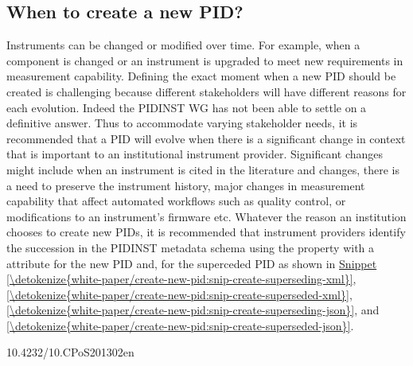 \documentclass[a4paper,10pt,english]{sphinxmanual}
\begin{document}
\subsection{When to create a new PID?}
\label{\detokenize{white-paper/create-new-pid:when-to-create-a-new-pid}}\label{\detokenize{white-paper/create-new-pid::doc}}
Instruments can be changed or modified over time. For example, when a
component is changed or an instrument is upgraded to meet new
requirements in measurement capability. Defining the exact moment when a
new PID should be created is challenging because different stakeholders
will have different reasons for each evolution. Indeed the PIDINST WG
has not been able to settle on a definitive answer. Thus to accommodate
varying stakeholder needs, it is recommended that a PID will evolve when
there is a significant change in context that is important to an
institutional instrument provider. Significant changes might include
when an instrument is cited in the literature and changes, there is a
need to preserve the instrument history, major changes in measurement
capability that affect automated workflows such as quality control, or
modifications to an instrument’s firmware etc. Whatever the reason an
institution chooses to create new PIDs, it is recommended that
instrument providers identify the succession in the PIDINST metadata
schema using the  property with a 
attribute  for the new PID and, 
for the superceded PID as shown in
\hyperref[\detokenize{white-paper/create-new-pid:snip-create-superseding-xml}]{Snippet \ref{\detokenize{white-paper/create-new-pid:snip-create-superseding-xml}}},
\hyperref[\detokenize{white-paper/create-new-pid:snip-create-superseded-xml}]{\ref{\detokenize{white-paper/create-new-pid:snip-create-superseded-xml}}},
\hyperref[\detokenize{white-paper/create-new-pid:snip-create-superseding-json}]{\ref{\detokenize{white-paper/create-new-pid:snip-create-superseding-json}}}, and
\hyperref[\detokenize{white-paper/create-new-pid:snip-create-superseded-json}]{\ref{\detokenize{white-paper/create-new-pid:snip-create-superseded-json}}}.
\def\sphinxLiteralBlockLabel{\label{\detokenize{white-paper/create-new-pid:id1}}\label{\detokenize{white-paper/create-new-pid:snip-create-superseding-xml}}}
\begin{sphinxVerbatim}[commandchars=\\\{\}]
       10.4232/10.CPoS\PYGZhy{}2013\PYGZhy{}02en
\end{sphinxVerbatim}
\end{document}
